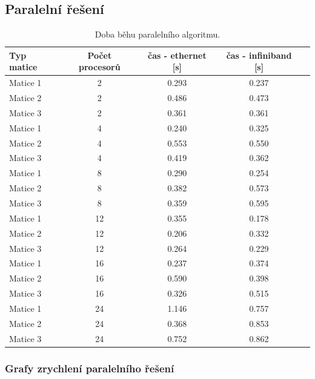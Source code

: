 \documentclass[12pt]{article}
\begin{document}
\subsection{Paralelní řešení}
\begin{table}[ht]
\centering
\begin{tabular}{|l|c|c|c|c|}
\hline \textbf{Typ matice} & \textbf{Počet procesorů} & \textbf{čas - ethernet [s]} & \textbf{čas - infiniband [s]} \\
\hline 
\hline Matice 1 & 2 & 0.293 & 0.237 \\ 
\hline Matice 2 & 2 & 0.486 & 0.473 \\ 
\hline Matice 3 & 2 & 0.361 & 0.361 \\ 
\hline
\hline Matice 1 & 4 & 0.240 & 0.325 \\ 
\hline Matice 2 & 4 & 0.553 & 0.550 \\ 
\hline Matice 3 & 4 & 0.419 & 0.362 \\ 
\hline 
\hline Matice 1 & 8 & 0.290 & 0.254 \\ 
\hline Matice 2 & 8 & 0.382 & 0.573 \\ 
\hline Matice 3 & 8 & 0.359 & 0.595 \\ 
\hline 
\hline Matice 1 & 12 & 0.355 & 0.178 \\ 
\hline Matice 2 & 12 & 0.206 & 0.332 \\ 
\hline Matice 3 & 12 & 0.264 & 0.229 \\ 
\hline 
\hline Matice 1 & 16 & 0.237 & 0.374 \\ 
\hline Matice 2 & 16 & 0.590 & 0.398 \\ 
\hline Matice 3 & 16 & 0.326 & 0.515 \\ 
\hline 
\hline Matice 1 & 24 & 1.146 & 0.757 \\ 
\hline Matice 2 & 24 & 0.368 & 0.853 \\ 
\hline Matice 3 & 24 & 0.752 & 0.862 \\ 
\hline 
\end{tabular}
\caption{Doba běhu paralelního algoritmu.}
\label{doba_behu_paralelne}	
\end{table}


\subsubsection{Grafy zrychlení paralelního řešení}

\\

\\

\end{document}
